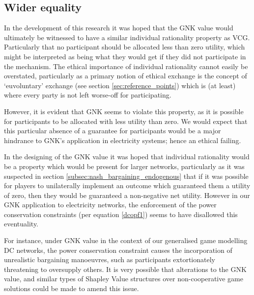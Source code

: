 

\subsection{Wider equality}\label{sec:wider_equality_gnk}

In the development of this research it was hoped that the GNK value would ultimately be witnessed to have a similar individual rationality property as VCG.
Particularly that no participant should be allocated less than zero utility, which might be interpreted as being what they would get if they did not participate in the mechanism.
The ethical importance of individual rationality cannot easily be overstated, particularly as a primary notion of ethical exchange is the concept of `euvoluntary' exchange (see section \ref{sec:reference_points}) which is (at least) where every party is not left worse-off for participating.

However, it is evident that GNK seems to violate this property, as it is possible for participants to be allocated with less utility than zero.
We would expect that this particular absence of a guarantee for participants would be a major hindrance to GNK's application in electricity systems; hence an ethical failing.

In the designing of the GNK value it was hoped that individual rationality would be a property which would be present for larger networks, particularly as it was suspected in section \ref{subsec:nash_bargaining_endogenous} that if it was possible for players to unilaterally implement an outcome which guaranteed them a utility of zero, then they would be guaranteed a non-negative net utility.
However in our GNK application to electricity networks, the enforcement of the power conservation constraints (per equation \ref{dcopf1}) seems to have disallowed this eventuality.

For instance, under GNK value in the context of our generalised game modelling DC networks, the power conservation constraint causes the incorporation of unrealistic bargaining manoeuvres, such as participants extortionately threatening to oversupply others.
It is very possible that alterations to the GNK value, and similar types of Shapley Value structures over non-cooperative game solutions could be made to amend this issue.


